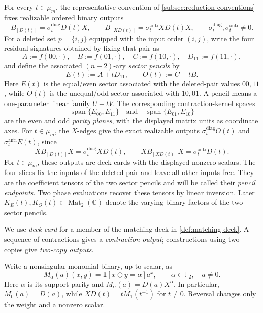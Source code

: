 \documentclass[11pt,letterpaper,onecolumn]{article}
\theoremstyle{plain}
\theoremstyle{definition}
\theoremstyle{remark}
\newcommand{\Ftwo}{\mathbb F_2}
\newcommand{\Mat}{\operatorname{Mat}}
\newcommand{\Span}{\operatorname{span}}
\newcommand{\one}{\mathbf 1}
\begin{document}
For every \(t\in\mu_m\), the representative convention of
\cref{subsec:reduction-conventions} fixes realizable ordered binary outputs
\begin{equation*}
  B_{[D(t)]}=\sigma_t^{\mathrm{diag}}D(t)X,
  \qquad
  B_{[XD(t)]}=\sigma_t^{\mathrm{anti}}XD(t)X,
  \qquad
  \sigma_t^{\mathrm{diag}},\sigma_t^{\mathrm{anti}}\ne0.
\end{equation*}
For a deleted set \(p=\{i,j\}\) equipped with the input order \((i,j)\),
write the four residual signatures obtained by fixing that pair as
\begin{equation*}
  A:=f(00,\mathord\cdot),\quad
  B:=f(01,\mathord\cdot),\quad
  C:=f(10,\mathord\cdot),\quad
  D_{11}:=f(11,\mathord\cdot),
\end{equation*}
and define the associated \((n-2)\)-ary \emph{sector pencils} by
\hypertarget{eq:nd-sector-pencils}{}
\begin{equation*}
 E(t):=A+tD_{11},
 \qquad
 O(t):=C+tB.
\end{equation*}
Here \(E(t)\) is the equal/even sector associated with the deleted-pair
values \(00,11\), while \(O(t)\) is the unequal/odd sector associated with
\(10,01\).  A pencil means a one-parameter linear family \(U+tV\).
The corresponding contraction-kernel spaces
\[
 \Span\{E_{00},E_{11}\}
 \quad\text{and}\quad
 \Span\{E_{01},E_{10}\}
\]
are the even and odd \emph{parity planes}, with the displayed matrix
units as coordinate axes.
For \(t\in\mu_m\), the \(X\)-edges give the exact realizable outputs
\(\sigma_t^{\mathrm{diag}}O(t)\) and \(\sigma_t^{\mathrm{anti}}E(t)\), since
\[
  XB_{[D(t)]}X
    =\sigma_t^{\mathrm{diag}}XD(t),
  \qquad
  XB_{[XD(t)]}X
    =\sigma_t^{\mathrm{anti}}D(t).
\]
For \(t\in\mu_m\), these outputs are deck cards with the displayed
nonzero scalars. The four slices fix the inputs of the deleted pair and
leave all other inputs free. They are the coefficient tensors of the two
sector pencils and will be called their \emph{pencil endpoints}.
Two phase evaluations recover these tensors by linear inversion.
Later \(K_E(t),K_O(t)\in\Mat_2(\mathbb C)\) denote the varying
binary factors of the two sector pencils.

We use \emph{deck card} for a member of the matching deck in
\cref{def:matching-deck}. A sequence of contractions gives a
\emph{contraction output}; constructions using two copies give
\emph{two-copy outputs}.

Write a nonsingular monomial binary, up to scalar, as
\begin{equation*}
  M_\alpha(a)(x,y)
  =\one[x\oplus y=\alpha]a^x,
  \qquad
  \alpha\in\Ftwo,\quad a\ne0.
\end{equation*}
Here \(\alpha\) is its support parity and \(M_\alpha(a)=D(a)X^\alpha\). In particular, \(M_0(a)=D(a)\), while \(XD(t)=tM_1(t^{-1})\) for \(t\ne0\). Reversal changes only the weight and a nonzero scalar.
\end{document}
